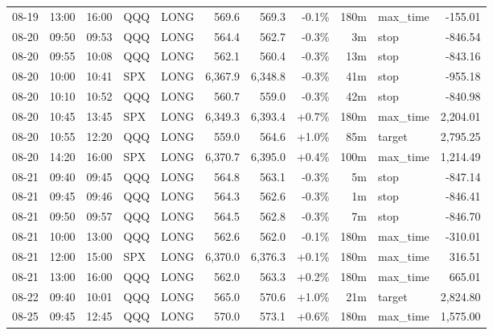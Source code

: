 \documentclass[11pt,a4paper,twoside]{article}
\begin{document}
\begin{center}
\begin{longtable}{>{\color{txtmain}}l l l l l r r r r >{\color{txtmain}}l r}
08-19 & 13:00 & 16:00 & QQQ & LONG & 569.6 & 569.3 & \textcolor{lossred}{-0.1\%} & 180m & max\_time & \textcolor{lossred}{-155.01} \\
08-20 & 09:50 & 09:53 & QQQ & LONG & 564.4 & 562.7 & \textcolor{lossred}{-0.3\%} & 3m & stop & \textcolor{lossred}{-846.54} \\
08-20 & 09:55 & 10:08 & QQQ & LONG & 562.1 & 560.4 & \textcolor{lossred}{-0.3\%} & 13m & stop & \textcolor{lossred}{-843.16} \\
08-20 & 10:00 & 10:41 & SPX & LONG & 6,367.9 & 6,348.8 & \textcolor{lossred}{-0.3\%} & 41m & stop & \textcolor{lossred}{-955.18} \\
08-20 & 10:10 & 10:52 & QQQ & LONG & 560.7 & 559.0 & \textcolor{lossred}{-0.3\%} & 42m & stop & \textcolor{lossred}{-840.98} \\
08-20 & 10:45 & 13:45 & SPX & LONG & 6,349.3 & 6,393.4 & \textcolor{wingreen}{+0.7\%} & 180m & max\_time & \textcolor{wingreen}{2,204.01} \\
08-20 & 10:55 & 12:20 & QQQ & LONG & 559.0 & 564.6 & \textcolor{wingreen}{+1.0\%} & 85m & target & \textcolor{wingreen}{2,795.25} \\
08-20 & 14:20 & 16:00 & SPX & LONG & 6,370.7 & 6,395.0 & \textcolor{wingreen}{+0.4\%} & 100m & max\_time & \textcolor{wingreen}{1,214.49} \\
08-21 & 09:40 & 09:45 & QQQ & LONG & 564.8 & 563.1 & \textcolor{lossred}{-0.3\%} & 5m & stop & \textcolor{lossred}{-847.14} \\
08-21 & 09:45 & 09:46 & QQQ & LONG & 564.3 & 562.6 & \textcolor{lossred}{-0.3\%} & 1m & stop & \textcolor{lossred}{-846.41} \\
08-21 & 09:50 & 09:57 & QQQ & LONG & 564.5 & 562.8 & \textcolor{lossred}{-0.3\%} & 7m & stop & \textcolor{lossred}{-846.70} \\
08-21 & 10:00 & 13:00 & QQQ & LONG & 562.6 & 562.0 & \textcolor{lossred}{-0.1\%} & 180m & max\_time & \textcolor{lossred}{-310.01} \\
08-21 & 12:00 & 15:00 & SPX & LONG & 6,370.0 & 6,376.3 & \textcolor{wingreen}{+0.1\%} & 180m & max\_time & \textcolor{wingreen}{316.51} \\
08-21 & 13:00 & 16:00 & QQQ & LONG & 562.0 & 563.3 & \textcolor{wingreen}{+0.2\%} & 180m & max\_time & \textcolor{wingreen}{665.01} \\
08-22 & 09:40 & 10:01 & QQQ & LONG & 565.0 & 570.6 & \textcolor{wingreen}{+1.0\%} & 21m & target & \textcolor{wingreen}{2,824.80} \\
08-25 & 09:45 & 12:45 & QQQ & LONG & 570.0 & 573.1 & \textcolor{wingreen}{+0.6\%} & 180m & max\_time & \textcolor{wingreen}{1,575.00} \\

\end{longtable}
\end{center}
\end{document}
